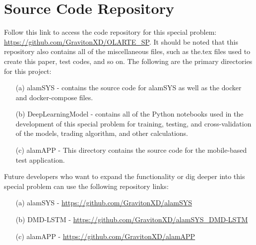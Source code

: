 \chapter{Source Code Repository}
\label{sec:appendix_a}
Follow this link to access the code repository for this special problem: \url{https://github.com/GravitonXD/OLARTE_SP}.
It should be noted that this repository also contains all of the miscellaneous files, 
such as the.tex files used to create this paper, test codes, and so on. The following are the 
primary directories for this project:
\begin{itemize}
    \item[(a)] alamSYS - contains the source code for alamSYS as well as the docker and docker-compose files.
    \item[(b)] DeepLearningModel - contains all of the Python notebooks used in the development of this special 
    problem for training, testing, and cross-validation of the models, trading algorithm, and other calculations.
    \item[(c)] alamAPP - This directory contains the source code for the mobile-based test application.
\end{itemize}

Future developers who want to expand the functionality or dig deeper into this special problem can use the 
following repository links:
\begin{itemize}
    \item[(a)] alamSYS - \url{https://github.com/GravitonXD/alamSYS}
    \item[(b)] DMD-LSTM - \url{https://github.com/GravitonXD/alamSYS_DMD-LSTM}
    \item[(c)] alamAPP - \url{https://github.com/GravitonXD/alamAPP}
\end{itemize}